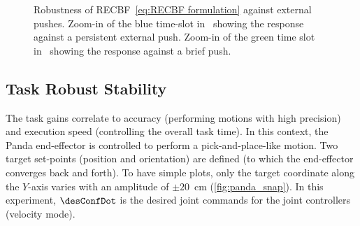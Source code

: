 \begin{figure}
\centering
{}
{}
\hfil
{}
\caption{ Robustness of RECBF~\cref{eq:RECBF formulation} against external pushes.  Zoom-in of the blue time-slot in~ showing the response against a persistent external push.  Zoom-in of the green time slot in~ showing the response against a brief push.}
\label{fig:com push}
\end{figure}

\subsection{Task Robust Stability}\label{subsec-chap3:experiment_robust stability} 
The task gains correlate to accuracy (performing motions with high precision) and execution speed (controlling the overall task time). In this context, the Panda end-effector is controlled to perform a pick-and-place-like motion. Two target set-points (position and orientation) are defined (to which the end-effector converges back and forth). To have simple plots, only the target coordinate along the $Y$-axis varies with an amplitude of $\pm20$~cm (\cref{fig:panda_snap}). In this experiment, $\desConfDot$ is the desired joint commands for the joint controllers (velocity mode).

